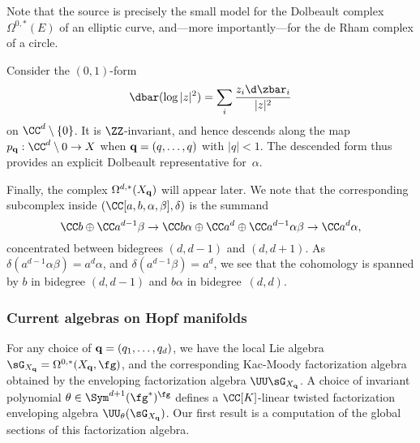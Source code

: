 Note that the source is precisely the small model for the Dolbeault complex $\Omega^{0, *}(E)$ of an elliptic curve,
and---more importantly---for the de Rham complex of a circle.

\begin{eg}
Consider 
the $(0,1)$-form 
\[
\dbar (\log |z|^2) = \sum_i \frac{z_i\d \zbar_i}{|z|^2} 
\]
on $\CC^d \setminus \{0\}$.
It is $\ZZ$-invariant, and hence descends along the map $p_{\bf q} : \CC^d \setminus 0 \to X$
when ${\bf q} = (q,\ldots,q)$ with $|q| < 1$.
The descended form thus provides an explicit Dolbeault representative for~$\alpha$.
\end{eg}

Finally, the complex  $\Omega^{d, *}(X_{\bf q})$ will appear later. 
We note that the corresponding subcomplex inside $(\CC[a, b, \alpha, \beta], \delta)$ is the summand
\[
\CC b \oplus \CC a^{d-1} \beta \to \CC b \alpha \oplus \CC a^{d} \oplus \CC a^{d-1} \alpha \beta \to \CC a^{d} \alpha,
\]
concentrated between bidegrees $(d,d-1)$ and $(d,d+1)$.
As $\delta(a^{d-1} \alpha \beta) = a^d \alpha$, and $\delta(a^{d-1} \beta) = a^d$, 
we see that the cohomology is spanned by $b$ in bidegree $(d,d-1)$ and $b \alpha$ in bidegree~$(d,d)$.


\subsubsection{Current algebras on Hopf manifolds}

For any choice of ${\bf q} = (q_1,\ldots,q_d)$, we have the local Lie algebra $\sG_{X_{\bf q}} = \Omega^{0,*}(X_{\bf q}, \fg)$, and the corresponding Kac-Moody factorization algebra obtained by the enveloping factorization algebra $\UU\sG_{X_{\bf q}}$.
A choice of invariant polynomial $\theta \in \Sym^{d+1}(\fg^*)^\fg$ defines a $\CC[K]$-linear twisted factorization enveloping algebra $\UU_{\theta}(\sG_{X_{\bf q}})$.  
Our first result is a computation of the global sections of this factorization algebra.  

